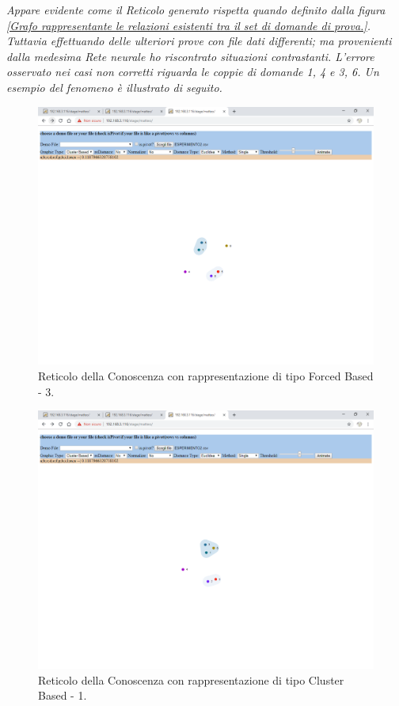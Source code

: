 \noindent
\textit{Appare evidente come il Reticolo generato rispetta quando definito dalla figura \ref{Grafo rappresentante le relazioni esistenti tra il set di domande di prova.}.\\
Tuttavia effettuando delle ulteriori prove con file dati differenti; ma provenienti dalla medesima Rete neurale ho riscontrato situazioni contrastanti. L'errore osservato nei casi non corretti riguarda le coppie di domande 1, 4 e 3, 6. Un esempio del fenomeno \`e illustrato di seguito.}
\begin{figure}[H]
\centering
	\includegraphics[width=1\linewidth]{./image/reticoloNonCorretto1.png}
	\caption{Reticolo della Conoscenza con rappresentazione di tipo Forced Based - 3.}
	\label{Reticolo della Conoscenza con rappresentazione di tipo Forced Based - 3.}
\end{figure}
\noindent
\begin{figure}[H]
\centering
	\includegraphics[width=1\linewidth]{./image/reticoloNonCorretto2.png}
	\caption{Reticolo della Conoscenza con rappresentazione di tipo Cluster Based - 1.}
	\label{Reticolo della Conoscenza con rappresentazione di tipo Cluster Based - 1.}
\end{figure}
